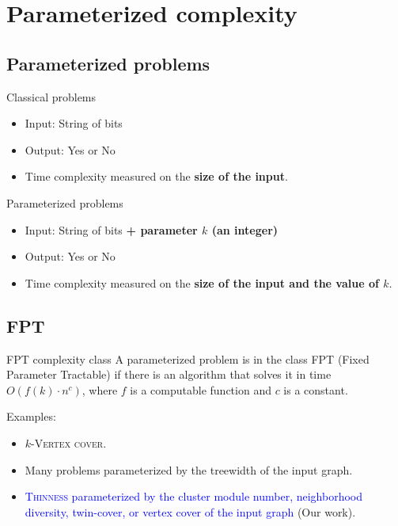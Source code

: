 \documentclass{beamer}
\begin{document}
\section{Parameterized complexity}

\subsection{Parameterized problems}
\begin{frame}{Classical problems}
    \begin{itemize}
    \item Input: String of bits
    \item Output: Yes or No
    \item Time complexity measured on the \textbf{size of the input}.
    \end{itemize}
\end{frame}

\begin{frame}{Parameterized problems}
    \begin{itemize}
    \item Input: String of bits \textbf{+ parameter $k$ (an integer)}
    \item Output: Yes or No
    \item Time complexity measured on the \textbf{size of the input and the value of $k$}.
    \end{itemize}
\end{frame}

\subsection{FPT}
\begin{frame}{FPT complexity class}
    A parameterized problem is in the class FPT (Fixed Parameter Tractable) if there is an algorithm that solves it in time $O(f(k) \cdot n^c)$, where $f$ is a computable function and $c$ is a constant.
    \pause

    Examples:
    \begin{itemize}
        \item<2-> $k$-\textsc{Vertex cover}.
        \item<3-> Many problems parameterized by the treewidth of the input graph.
        \item<4-> \textcolor{blue}{\textsc{Thinness} parameterized by the cluster module number, neighborhood diversity, twin-cover, or vertex cover of the input graph} (Our work).
    \end{itemize}
\end{frame}
\end{document}
